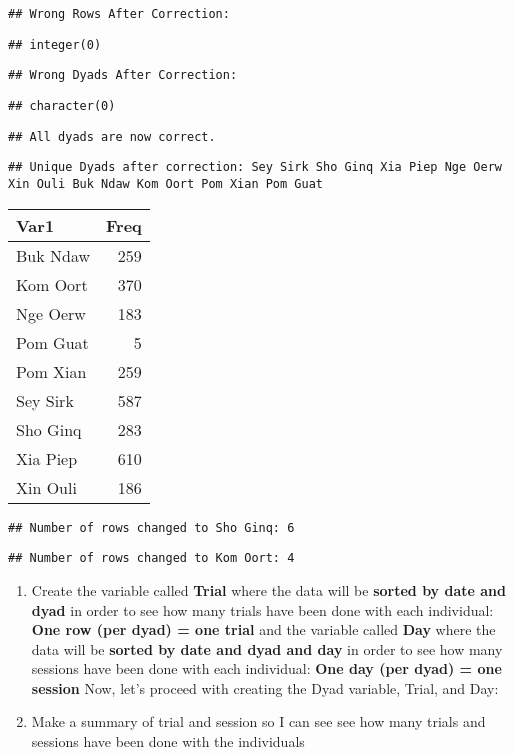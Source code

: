 \documentclass[
]{article}
\begin{document}
\begin{verbatim}
## Wrong Rows After Correction:
\end{verbatim}

\begin{verbatim}
## integer(0)
\end{verbatim}

\begin{verbatim}
## Wrong Dyads After Correction:
\end{verbatim}

\begin{verbatim}
## character(0)
\end{verbatim}

\begin{verbatim}
## All dyads are now correct.
\end{verbatim}

\begin{verbatim}
## Unique Dyads after correction: Sey Sirk Sho Ginq Xia Piep Nge Oerw Xin Ouli Buk Ndaw Kom Oort Pom Xian Pom Guat
\end{verbatim}

\begin{longtable}[]{@{}lr@{}}
\toprule
Var1 & Freq \\
\midrule
\endhead
Buk Ndaw & 259 \\
Kom Oort & 370 \\
Nge Oerw & 183 \\
Pom Guat & 5 \\
Pom Xian & 259 \\
Sey Sirk & 587 \\
Sho Ginq & 283 \\
Xia Piep & 610 \\
Xin Ouli & 186 \\
\bottomrule
\end{longtable}

\begin{verbatim}
## Number of rows changed to Sho Ginq: 6
\end{verbatim}

\begin{verbatim}
## Number of rows changed to Kom Oort: 4
\end{verbatim}

\begin{enumerate}
\def\labelenumi{\arabic{enumi}.}
\setcounter{enumi}{2}
\item
  Create the variable called \textbf{Trial} where the data will be
  \textbf{sorted by date and dyad} in order to see how many trials have
  been done with each individual: \textbf{One row (per dyad) = one
  trial} and the variable called \textbf{Day} where the data will be
  \textbf{sorted by date and dyad and day} in order to see how many
  sessions have been done with each individual: \textbf{One day (per
  dyad) = one session} Now, let's proceed with creating the Dyad
  variable, Trial, and Day:
\item
  Make a summary of trial and session so I can see see how many trials
  and sessions have been done with the individuals
\end{enumerate}
\end{document}
